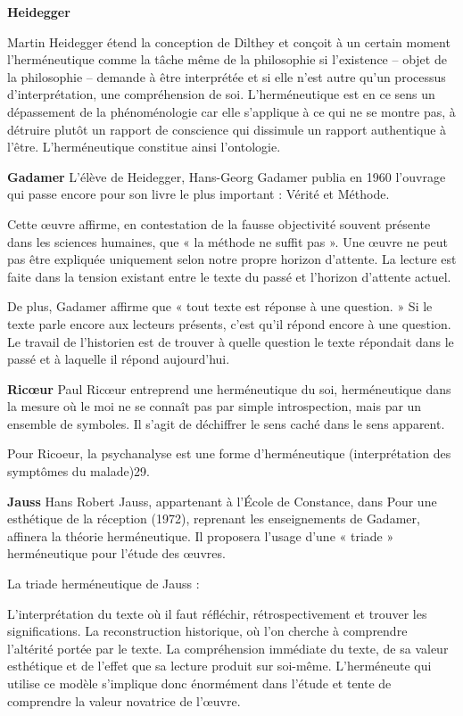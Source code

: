 \textbf{Heidegger}
 
Martin Heidegger étend la conception de Dilthey et conçoit à un certain moment l'herméneutique comme la tâche même de la philosophie si l'existence – objet de la philosophie – demande à être interprétée et si elle n'est autre qu'un processus d'interprétation, une compréhension de soi. L'herméneutique est en ce sens un dépassement de la phénoménologie car elle s'applique à ce qui ne se montre pas, à détruire plutôt un rapport de conscience qui dissimule un rapport authentique à l'être. L'herméneutique constitue ainsi l'ontologie.

\textbf{Gadamer}
L'élève de Heidegger, Hans-Georg Gadamer publia en 1960 l'ouvrage qui passe encore pour son livre le plus important : Vérité et Méthode.

Cette œuvre affirme, en contestation de la fausse objectivité souvent présente dans les sciences humaines, que « la méthode ne suffit pas ». Une œuvre ne peut pas être expliquée uniquement selon notre propre horizon d'attente. La lecture est faite dans la tension existant entre le texte du passé et l'horizon d'attente actuel.

De plus, Gadamer affirme que « tout texte est réponse à une question. » Si le texte parle encore aux lecteurs présents, c'est qu'il répond encore à une question. Le travail de l'historien est de trouver à quelle question le texte répondait dans le passé et à laquelle il répond aujourd'hui.

\textbf{Ricœur}
Paul Ricœur entreprend une herméneutique du soi, herméneutique dans la mesure où le moi ne se connaît pas par simple introspection, mais par un ensemble de symboles. Il s'agit de déchiffrer le sens caché dans le sens apparent.

Pour Ricoeur, la psychanalyse est une forme d'herméneutique (interprétation des symptômes du malade)29.

\textbf{Jauss}
Hans Robert Jauss, appartenant à l'École de Constance, dans Pour une esthétique de la réception (1972), reprenant les enseignements de Gadamer, affinera la théorie herméneutique. Il proposera l'usage d'une « triade » herméneutique pour l'étude des œuvres.

La triade herméneutique de Jauss :

L'interprétation du texte où il faut réfléchir, rétrospectivement et trouver les significations.
La reconstruction historique, où l'on cherche à comprendre l'altérité portée par le texte.
La compréhension immédiate du texte, de sa valeur esthétique et de l'effet que sa lecture produit sur soi-même.
L'herméneute qui utilise ce modèle s'implique donc énormément dans l'étude et tente de comprendre la valeur novatrice de l'œuvre.

